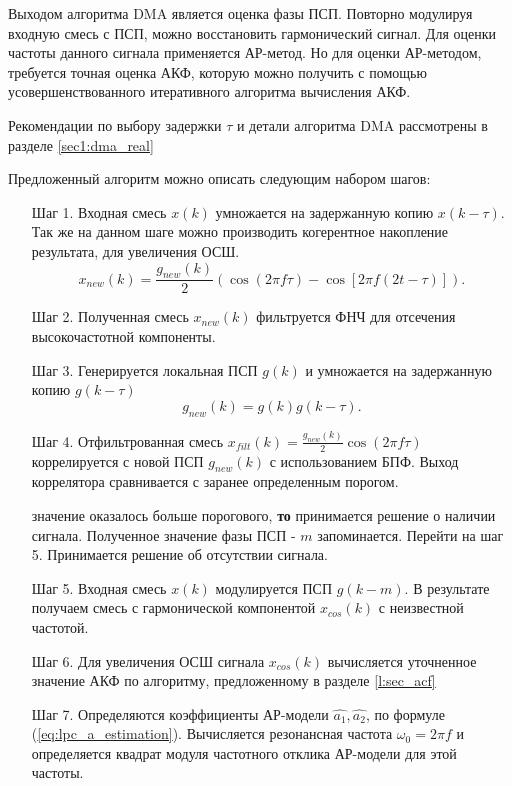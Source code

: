 Выходом алгоритма DMA является оценка фазы ПСП. Повторно модулируя входную смесь с ПСП, можно восстановить гармонический сигнал. Для оценки частоты данного сигнала применяется
АР-метод. Но для оценки АР-методом, требуется точная оценка АКФ, которую можно получить
с помощью усовершенствованного итеративного алгоритма вычисления АКФ.

Рекомендации по выбору задержки ${\tau}$ и детали алгоритма DMA рассмотрены в разделе \ref{sec1:dma_real}

Предложенный алгоритм можно описать следующим набором шагов:
\begin{itemize}[align=left,style=nextline,leftmargin=*,labelsep=\parindent,font=\normalfont]
\item[Шаг 1.] Входная смесь ${x(k)}$ умножается на задержанную копию ${x(k-\tau)}$. Так же
	на данном шаге можно производить когерентное накопление результата, для
	увеличения ОСШ.
	\begin{equation}
		x_{new}(k) = \frac{g_{new}(k)}{2} \left(\cos (2\pi f \tau) - \cos \left[2 \pi f (2t - \tau)\right]\right).
	\end{equation}

\item[Шаг 2.] Полученная смесь ${x_{new}(k)}$ фильтруется ФНЧ для отсечения высокочастотной компоненты.
\item[Шаг 3.] Генерируется локальная ПСП ${g(k)}$ и умножается на задержанную копию ${g(k-\tau)}$
	\begin{equation}
		g_{new}(k) = g(k)g(k-\tau).
	\end{equation}

\item[Шаг 4.] Отфильтрованная смесь ${x_{filt}(k) = \frac{g_{new}(k)}{2} \cos (2\pi f \tau)}$ коррелируется с новой ПСП ${g_{new}(k)}$
	с использованием БПФ. Выход коррелятора сравнивается с заранее определенным порогом.

	  значение оказалось больше порогового, {\bf{то}}
		принимается решение о наличии сигнала. Полученное значение фазы ПСП  - ${m}$ запоминается.
		Перейти на шаг 5.
		Принимается решение об отсутствии сигнала.
\item[Шаг 5.] Входная смесь ${x(k)}$ модулируется ПСП ${g(k-m)}$. В результате получаем смесь с гармонической компонентой 
	${x_{cos}(k)}$ с неизвестной частотой.
\item[Шаг 6.] Для увеличения ОСШ сигнала ${x_{cos}(k)}$ вычисляется уточненное значение АКФ
	по алгоритму, предложенному в разделе \ref{l:sec_acf}
\item[Шаг 7.] Определяются коэффициенты АР-модели ${\hat{a_1}, \hat{a_2}}$, по формуле \mbox{(\ref{eq:lpc_a_estimation}).} 
	Вычисляется резонансная частота ${\omega_0 = 2 \pi f}$ и определяется квадрат модуля частотного отклика АР-модели для этой частоты. 
\end{itemize}

